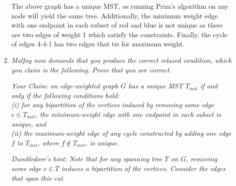 \documentclass[12pt]{article}
\newcommand{\convexpath}[2]{
[   
    create hullnodes/.code={
        \global\edef\namelist{#1}
        \foreach [count=\counter] \nodename in \namelist {
            \global\edef\numberofnodes{\counter}
            \node at (\nodename) [draw=none,name=hullnode\counter] {};
        }
        \node at (hullnode\numberofnodes) [name=hullnode0,draw=none] {};
        \pgfmathtruncatemacro\lastnumber{\numberofnodes+1}
        \node at (hullnode1) [name=hullnode\lastnumber,draw=none] {};
    },
    create hullnodes
]
($(hullnode1)!#2!-90:(hullnode0)$)
\foreach [
    evaluate=\currentnode as \previousnode using \currentnode-1,
    evaluate=\currentnode as \nextnode using \currentnode+1
    ] \currentnode in {1,...,\numberofnodes} {
  let
    \p1 = ($(hullnode\currentnode)!#2!-90:(hullnode\previousnode)$),
    \p2 = ($(hullnode\currentnode)!#2!90:(hullnode\nextnode)$),
    \p3 = ($(\p1) - (hullnode\currentnode)$),
    \n1 = {atan2(\y3,\x3)},
    \p4 = ($(\p2) - (hullnode\currentnode)$),
    \n2 = {atan2(\y4,\x4)},
    \n{delta} = {-Mod(\n1-\n2,360)}
  in 
    {-- (\p1) arc[start angle=\n1, delta angle=\n{delta}, radius=#2] -- (\p2)}
}
-- cycle
}
\begin{document}
\begin{enumerate}
\begin{enumerate}
         \begin{center}
         \end{center}
         
         The above graph has a unique MST, as running Prim's algorithm on any node will yield the same tree. Additionally, the minimum weight edge with one 
endpoint in each subset of red and blue is not unique as there are two edges of weight 1 which satisfy the constraints. Finally, the cycle of edges 4-4-1 has 
two edges that tie for maximum weight.
         
         \newpage
         \item \textit{Malfoy now demands that you produce the correct relaxed condition, which you claim is the following. Prove that you are correct.}
         
         \textit{Your Claim: an edge-weighted graph $G$ has a unique MST $T_{mst}$ if and only if the following conditions hold:} \\
         \textit{(i) for any bipartition of the vertices induced by removing some edge $e \in T_{mst}$, the minimum-weight edge with one endpoint in each 
subset is unique, and \\ (ii) the maximum-weight edge of any cycle constructed by adding one edge $f$ to $T_{mst}$, where $f \notin T_{mst}$, is unique.}
         
         \textit{Dumbledore's hint: Note that for any spanning tree $T$ on $G$, removing some edge $e \in T$ induces a bipartition of the vertices. Consider 
the edges that span this cut.}\\
         

\end{enumerate}
\end{enumerate}
\end{document}
